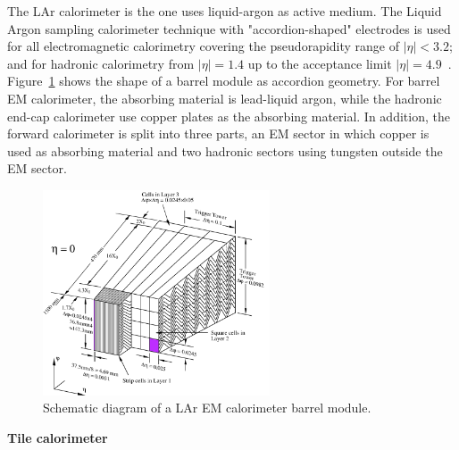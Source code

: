 The LAr calorimeter is the one uses liquid-argon as active medium.
The Liquid Argon sampling calorimeter technique with "accordion-shaped" electrodes is used for all electromagnetic calorimetry covering the pseudorapidity range of $|\eta|<3.2$;
and for hadronic calorimetry from $|\eta| = 1.4$ up to the acceptance limit $|\eta| = 4.9$~\cite{CERN-LHCC-96-041}.
Figure~\ref{fig:calo_lar} shows the shape of a barrel module as accordion geometry.
For barrel EM calorimeter, the absorbing material is lead-liquid argon, while the hadronic end-cap calorimeter use copper plates as the absorbing material.
In addition, the forward calorimeter is split into three parts, an EM sector in which copper is used as absorbing material and two hadronic sectors using tungsten outside the EM sector.
\begin{figure}[!htb]
  \centering
  \includegraphics[width=0.6\textwidth]{figures/Detector/calo_lar.png}
  \caption{Schematic diagram of a LAr EM calorimeter barrel module.}
  \label{fig:calo_lar}
\end{figure}

\textbf{Tile calorimeter}

